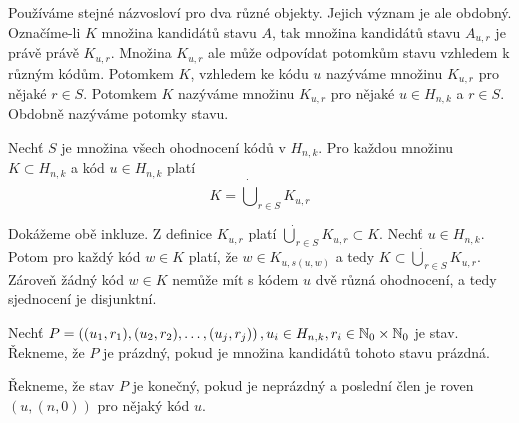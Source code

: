 \begin{pozn}
    Používáme stejné názvosloví pro dva různé objekty. Jejich význam je ale obdobný. Označíme-li $K$ množina kandidátů stavu $A$, tak množina kandidátů stavu $A_{u,r}$ je právě právě $K_{u,r}$. Množina $K_{u,r}$ ale může odpovídat potomkům stavu vzhledem k různým kódům. 
    Potomkem $K$, vzhledem ke kódu $u$ nazýváme množinu $K_{u,r}$ pro nějaké $r \in S$. Potomkem $K$ nazýváme množinu $K_{u,r}$ pro nějaké $u\in H_{n,k}$ a $r \in S$. Obdobně nazýváme potomky stavu. 
\end{pozn}

\begin{lemma}
    Nechť $S$ je množina všech ohodnocení kódů v $H_{n,k}$. Pro každou množinu $K \subset H_{n,k}$ a kód $u \in H_{n,k}$ platí
    \[K = \dot\bigcup_{r\in S} K_{u,r}\]
\end{lemma}
\begin{dukaz}
    Dokážeme obě inkluze. Z definice $K_{u,r}$ platí $\dot\bigcup_{r\in S} K_{u,r} \subset K$. Nechť $u \in H_{n,k}$. Potom pro každý kód $w \in K$ platí, že $w \in K_{u, s(u,w)}$ a tedy $K \subset \dot\bigcup_{r\in S} K_{u,r}$. Zároveň žádný kód $w \in K$ nemůže mít s kódem $u$ dvě různá ohodnocení, a tedy sjednocení je disjunktní. 
\end{dukaz}





\begin{definice}\label{kandidat}
  Nechť $P = \left((u_1, r_1), (u_2,r_2), \dots, (u_j,r_j)\right), u_i \in H_{n,k}, r_i \in \mathbb{N} _0 \times \mathbb{N} _0$ je stav. Řekneme, že $P$ je prázdný, pokud je množina kandidátů tohoto stavu prázdná. 

  Řekneme, že stav $P$ je konečný, pokud je neprázdný a poslední člen je roven $(u,(n,0))$ pro nějaký kód $u$.
\end{definice}

